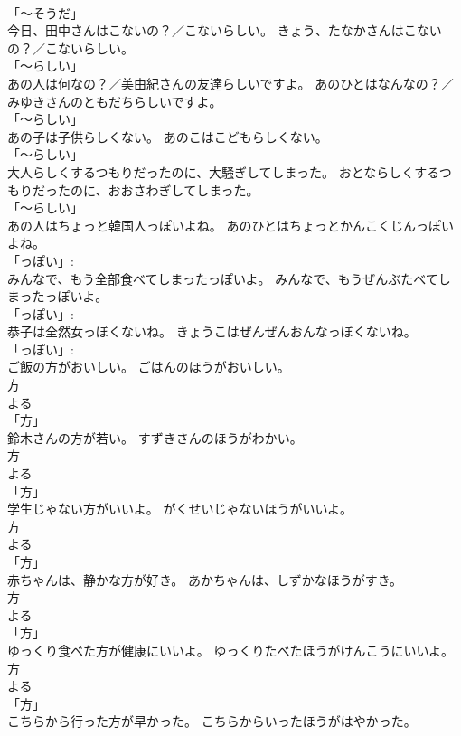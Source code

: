 \documentclass[8pt]{extreport}
\begin{document}
\begin{CJK}{UTF8}{min}
\\	「～そうだ」	
\\	今日、田中さんはこないの？／こないらしい。	きょう、たなかさんはこないの？／こないらしい。	
\\	「～らしい」	
\\	あの人は何なの？／美由紀さんの友達らしいですよ。	あのひとはなんなの？／みゆきさんのともだちらしいですよ。	
\\	「～らしい」	
\\	あの子は子供らしくない。	あのこはこどもらしくない。	
\\	「～らしい」	
\\	大人らしくするつもりだったのに、大騒ぎしてしまった。	おとならしくするつもりだったのに、おおさわぎしてしまった。	
\\	「～らしい」	
\\	あの人はちょっと韓国人っぽいよね。	あのひとはちょっとかんこくじんっぽいよね。	
\\	「っぽい」: 
\\	みんなで、もう全部食べてしまったっぽいよ。	みんなで、もうぜんぶたべてしまったっぽいよ。	
\\	「っぽい」: 
\\	恭子は全然女っぽくないね。	きょうこはぜんぜんおんなっぽくないね。	
\\	「っぽい」: 
\\	ご飯の方がおいしい。	ごはんのほうがおいしい。	
\\	方 
\\	よる 
\\	「方」 
\\	鈴木さんの方が若い。	すずきさんのほうがわかい。	
\\	方 
\\	よる 
\\	「方」 
\\	学生じゃない方がいいよ。	がくせいじゃないほうがいいよ。	
\\	方 
\\	よる 
\\	「方」 
\\	赤ちゃんは、静かな方が好き。	あかちゃんは、しずかなほうがすき。	
\\	方 
\\	よる 
\\	「方」 
\\	ゆっくり食べた方が健康にいいよ。	ゆっくりたべたほうがけんこうにいいよ。	
\\	方 
\\	よる 
\\	「方」 
\\	こちらから行った方が早かった。	こちらからいったほうがはやかった。	

\end{CJK}
\end{document}
